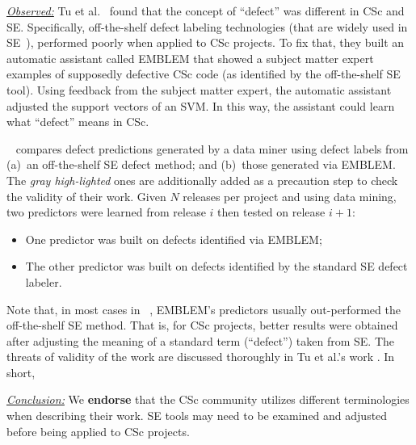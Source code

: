 \documentclass[conference,10pt]{IEEEtran}
\newcommand{\bi}{\begin{itemize}}
\newcommand{\ei}{\end{itemize}}
\newenvironment{RQ}{\vspace{1mm}\begin{tcolorbox}[enhanced,width=3.4in,size=fbox,colback=red!5!white,drop shadow southeast,sharp corners]}{\end{tcolorbox}}
\begin{document}
\noindent \textit{\underline{Observed:}} Tu et al.~\cite{tu2019better} found that the concept of ``defect'' was  different in CSc and SE.
Specifically, off-the-shelf defect labeling technologies (that are widely used  in SE~\cite{tu2019better,mockus00changeskeys,kamei12_jit, hindle08_largecommits, Kim08changes}),
performed poorly when applied to CSc projects.
To fix that, they built an automatic assistant called EMBLEM that showed a subject matter expert 
examples of supposedly defective CSc code (as identified by the off-the-shelf SE tool).
Using feedback from the subject matter expert, the automatic assistant adjusted the support vectors of an SVM. In this way, the assistant could learn what ``defect'' means in CSc.

~ 
compares defect predictions generated by a data
miner using defect labels from (a)~an off-the-shelf SE defect method;
and (b)~those generated via EMBLEM. The \textit{gray high-lighted} ones are additionally added as a precaution step to check the validity of their work. 
Given $N$ releases per project and using data mining, two predictors were learned from release $i$ then tested on release $i+1$:
\bi
\item
One predictor was built on defects identified  via EMBLEM;
\item
The other predictor was built on defects identified by the standard SE defect labeler.
\ei


Note that, in most cases in  ~,  EMBLEM's predictors usually out-performed the off-the-shelf SE method. 
That is, for CSc projects,
better results were obtained after adjusting the meaning of a standard term (``defect'')
taken from SE. The threats of validity of the work are discussed thoroughly in Tu et al.'s work \cite{tu2019better}. In short, 

\begin{RQ}
\textit{\underline{Conclusion:}} We \textbf{endorse} that the CSc community utilizes different terminologies when describing their work. SE tools
may need to be examined and adjusted before being applied to CSc projects.
\end{RQ} 
\end{document}
